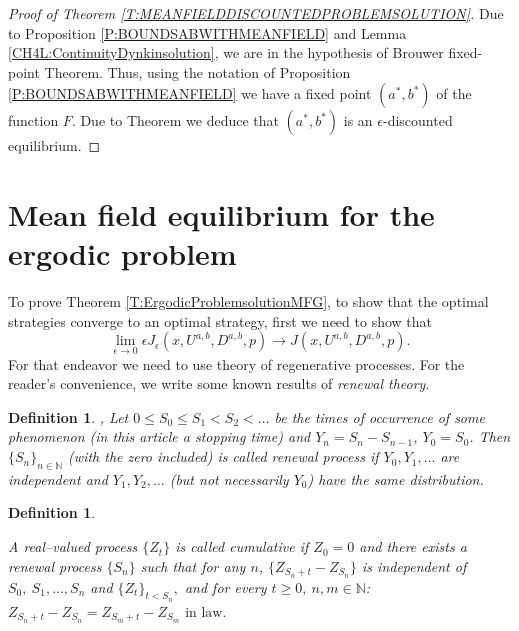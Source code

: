 \documentclass{article}
\newtheorem{definition}[thm]{Definition}
\begin{document}
\begin{proof}[Proof of Theorem \ref{T:MEANFIELDDISCOUNTEDPROBLEMSOLUTION}]
Due to Proposition \ref{P:BOUNDSABWITHMEANFIELD} and Lemma \ref{CH4L:ContinuityDynkinsolution}, we are in the hypothesis of Brouwer fixed-point Theorem. Thus, using the notation of Proposition \ref{P:BOUNDSABWITHMEANFIELD} we have a fixed point $(a^{\ast},b^{\ast})$ of the function $F$. Due to Theorem \cite[Theorem 1]{MO} we deduce that $(a^{\ast},b^{\ast})$ is an $\epsilon$-discounted equilibrium.
\end{proof} 
%


\section{Mean field equilibrium for the ergodic problem}\label{C43:MFGequilibriumforergodic}
To prove Theorem \ref{T:ErgodicProblemsolutionMFG}, to show that the optimal strategies converge to an optimal strategy, first we need to show that 
$$\lim_{\epsilon \to 0} \epsilon J_{\epsilon} (x,U^{a,b},D^{a,b},p) \to J(x,U^{a,b},D^{a,b},p). $$
For that endeavor we need to use theory of regenerative processes. For the reader's convenience, we write
some known results of \emph{renewal theory}. 




\begin{definition}\label{ChTools:renewalprocess}\cite[Chapter V, Section 1] {ASMUSSENQUEUES}, 
Let $0 \leq S_0 \leq S_1< S_2 < \dots $ be \emph{the times of occurrence of some phenomenon} (in this article a stopping time) and $Y_n=S_n-S_{n-1}$, $Y_0=S_0$. Then $\lbrace S_n\rbrace_{n \in \mathbb{N}}$ (with the zero included) is called renewal process if $Y_0,Y_1, \dots $ are independent and $Y_1, Y_2,\dots $ (but not necessarily $Y_0$) have the same distribution. 
\end{definition}



\begin{definition}\label{ChTools:accumulativeprocess}\cite[Chapter VI, Section 3]{ASMUSSENQUEUES}
  
A real–valued process $\lbrace Z_t \rbrace$ is called cumulative if $Z_0=0$ and there exists
a renewal process $\lbrace S_n \rbrace $ such that for any $n$, $ \lbrace Z_{S_n +t }-Z_{S_n} \rbrace$ is independent of $S_0, \ S_1, \dots ,S_n $ and $\lbrace Z_t \rbrace_{t < S_n},$ and for every $t\geq 0, \ n,m \in \mathbb{N}$:   
$Z_{S_n +t }-Z_{S_n}=Z_{S_m +t }-Z_{S_m}  \text{ in law.} $ 
\end{definition}
\end{document}
